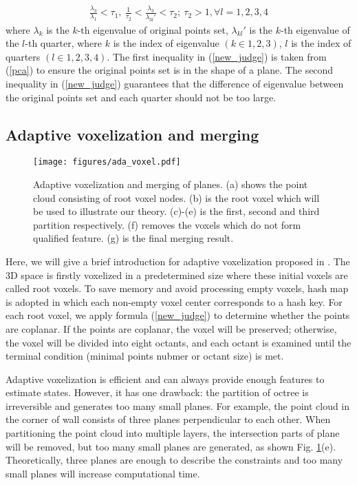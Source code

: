 \documentclass[letterpaper, 10 pt, conference]{ieeeconf}  %
\begin{document}
\begin{align}
	\frac{\lambda_{3}}{\lambda_{1}} < \tau_1, \
	\frac{1}{\tau_2} < \frac{\lambda_{3}}{\lambda_{3l}'} < \tau_2; \ \tau_2 > 1, \forall l=1,2,3,4
	\label{new_judge}
\end{align}
where $\lambda_k$ is the $k$-th eigenvalue of original points set, $\lambda_{kl}'$ is the $k$-th eigenvalue of the $l$-th quarter, where $k$ is the index of eigenvalue $(k\in{1,2,3})$, $l$ is the index of quarters $(l\in{1,2, 3, 4})$. The first inequality in (\ref{new_judge}) is taken from (\ref{pca}) to ensure the original points set is in the shape of a plane. The second inequality in (\ref{new_judge}) guarantees that the difference of eigenvalue between the original points set and each quarter should not be too large.

\subsection{Adaptive voxelization and merging}
\begin{figure} [t]
	\centering
	\texttt{[image: figures/ada\_voxel.pdf]}
	\caption{Adaptive voxelization and merging of planes. (a) shows the point cloud consisting of root voxel nodes. (b) is the root voxel which will be used to illustrate our theory. (c)-(e) is the first, second and third partition respectively. (f) removes the voxels which do not form qualified feature. (g) is the final merging result.}
	\label{fig merge}
\end{figure}

Here, we will give a brief introduction for adaptive voxelization proposed in \cite{liu2021balm}. The 3D space is firstly voxelized in a predetermined size where these initial voxels are called root voxels. To save memory and avoid processing empty voxels, hash map is adopted in which each non-empty voxel center corresponds to a hash key. For each root voxel, we apply formula (\ref{new_judge}) to determine whether the points are coplanar. If the points are coplanar, the voxel will be preserved; otherwise, the voxel will be divided into eight octants, and each octant is examined until the terminal condition (minimal points nubmer or octant size) is met. 

Adaptive voxelization is efficient and can always provide enough features to estimate states. However, it has one drawback: the partition of octree is irreversible and generates too many small planes. For example, the point cloud in the corner of wall consists of three planes perpendicular to each other. When partitioning the point cloud into multiple layers, the intersection parts of plane will be removed, but too many small planes are generated, as shown Fig. \ref{fig merge}(e). Theoretically, three planes are enough to describe the constraints and too many small planes will increase computational time.
\end{document}
